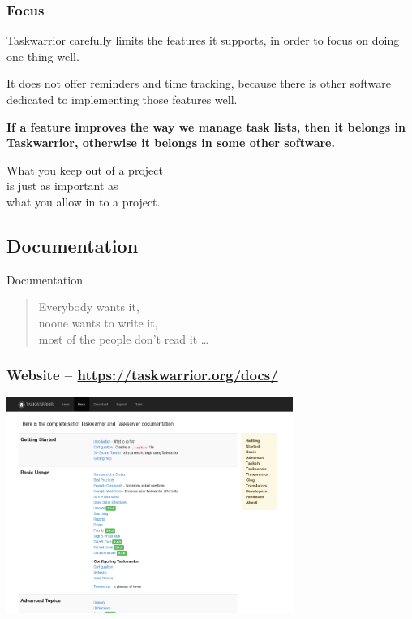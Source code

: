 \documentclass[t,handout,aspectratio=169]{beamer}
\begin{document}
\begin{frame}[fragile]\frametitle{Focus}
    \vfill
    Taskwarrior carefully limits the features it supports, in order to focus on doing one thing well. \pause

    It does not offer reminders and time tracking, because there is other software dedicated to implementing those features well. \pause

    \textbf{If a feature improves the way we manage task lists, then it belongs in Taskwarrior, otherwise it belongs in some other software.}
\end{frame}

\begin{frame}[standout]
    What you keep out of a project \\
    is just as important as \\
    what you allow in to a project.
\end{frame}

\subsection{Documentation}

\begin{frame}[fragile]{Documentation}
    \vfill
    \begin{quote}
        Everybody wants it, \\
        noone wants to write it, \\
        most of the people don't read it \ldots
    \end{quote}
\end{frame}

\begin{frame}[fragile]\frametitle{Website -- \url{https://taskwarrior.org/docs/}}
    \begin{center}
        \href{https://taskwarrior.org/docs/}{\includegraphics[height=7cm]{taskwarrior-org-docs.png}}
    \end{center}
\end{frame}
\end{document}
